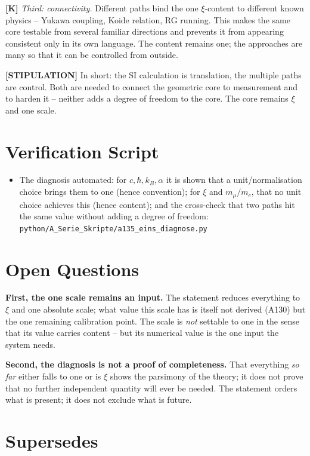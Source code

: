 \textbf{[K]} \emph{Third: connectivity.} Different paths bind the one $\xi$-content
to different known physics -- Yukawa coupling, Koide relation, RG running. This
makes the same core testable from several familiar directions and prevents it from
appearing consistent only in its own language. The content remains one; the
approaches are many so that it can be controlled from outside.

\textbf{[STIPULATION]} In short: the SI calculation is translation, the multiple
paths are control. Both are needed to connect the geometric core to measurement
and to harden it -- neither adds a degree of freedom to the core. The core remains
$\xi$ and one scale.

\section{Verification Script}

\begin{itemize}
  \item The diagnosis automated: for $c, \hbar, k_B, \alpha$ it is shown that a
    unit/normalisation choice brings them to one (hence convention); for $\xi$ and
    $m_\mu/m_e$, that no unit choice achieves this (hence content); and the
    cross-check that two paths hit the same value without adding a degree of
    freedom:
    \texttt{python/A\_Serie\_Skripte/a135\_eins\_diagnose.py}
\end{itemize}

\section{Open Questions}

\textbf{First, the one scale remains an input.} The statement reduces everything to
$\xi$ and one absolute scale; what value this scale has is itself not derived (A130)
but the one remaining calibration point. The scale is \emph{not} settable to one
in the sense that its value carries content -- but its numerical value is the one
input the system needs.

\textbf{Second, the diagnosis is not a proof of completeness.} That everything
\emph{so far} either falls to one or is $\xi$ shows the parsimony of the theory;
it does not prove that no further independent quantity will ever be needed. The
statement orders what is present; it does not exclude what is future.

\section{Supersedes}


